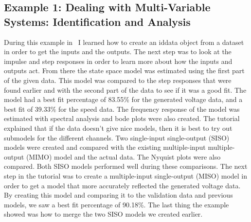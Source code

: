 \documentclass[letterpaper,12pt]{article}   %
\begin{document}
\subsection{Example 1: Dealing with Multi-Variable Systems: Identification and Analysis}
\label{sec:sysID-Example1}

During this example in~\cite{example1} I learned how to create an iddata object from a dataset in order to get the inputs and the outputs. The next step was to look at the impulse and step responses in order to learn more about how the inputs and outputs act. From there the state space model was estimated using the first part of the given data. This model was compared to the step responses that were found earlier and with the second part of the data to see if it was a good fit. The model had a best fit percentage of 83.55\% for the generated voltage data, and a best fit of 39.33\% for the speed data. The frequency response of the model was estimated with spectral analysis and bode plots were also created. The tutorial explained that if the data doesn’t give nice models, then it is best to try out submodels for the different channels. Two single-input single-output (SISO) models were created and compared with the existing multiple-input multiple-output (MIMO) model and the actual data. The Nyquist plots were also compared. Both SISO models performed well during these comparisons. The next step in the tutorial was to create a multiple-input single-output (MISO) model in order to get a model that more accurately reflected the generated voltage data. By creating this model and comparing it to the validation data and previous models, we saw a best fit percentage of 90.18\%. The last thing the example showed was how to merge the two SISO models we created earlier.
\end{document}
